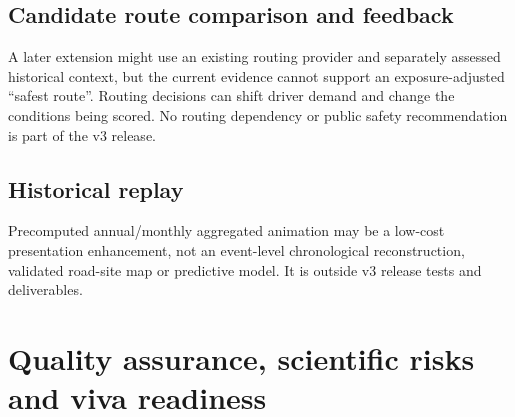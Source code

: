 \documentclass[11pt,a4paper,openany]{report}
\begin{document}
\section{Candidate route comparison and feedback}
A later extension might use an existing routing provider \cite{GoogleRoutes} and separately assessed historical context, but the current evidence cannot support an exposure-adjusted ``safest route''. Routing decisions can shift driver demand and change the conditions being scored. No routing dependency or public safety recommendation is part of the v3 release.

\section{Historical replay}
Precomputed annual/monthly aggregated animation may be a low-cost presentation enhancement, not an event-level chronological reconstruction, validated road-site map or predictive model. It is outside v3 release tests and deliverables.

\chapter{Quality assurance, scientific risks and viva readiness}
\end{document}
